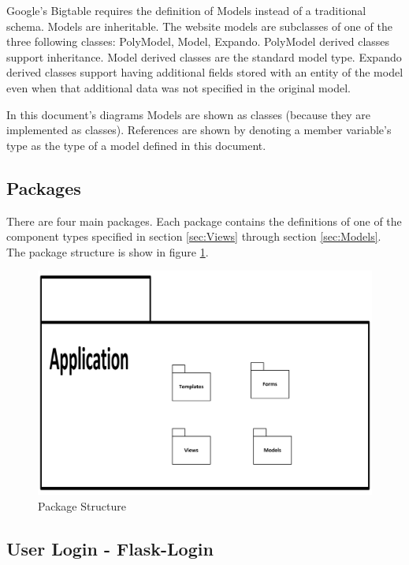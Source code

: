 \documentclass{article}
\begin{document}
Google's Bigtable requires the definition of Models instead of a traditional schema. Models are inheritable. The website models are subclasses of one of the three following classes: PolyModel, Model, Expando. PolyModel derived classes support inheritance. Model derived classes are the standard model type. Expando derived classes support having additional fields stored with an entity of the model even when that additional data was not specified in the original model.

In this document's diagrams Models are shown as classes (because they are implemented as classes). References are shown by denoting a member variable's type as the type of a model defined in this document.

\subsection{Packages}

There are four main packages. Each package contains the definitions of one of the component types specified in section \ref{sec:Views} through section \ref{sec:Models}. The package structure is show in figure \ref{fig:PackageStructure}.

\FloatBarrier
\begin{figure}[h1]
\centering
\includegraphics[scale=.75]{img/applicationStructure}
\caption{Package Structure}
\label{fig:PackageStructure}
\end{figure}
\FloatBarrier

\subsection{User Login - Flask-Login}
\end{document}
